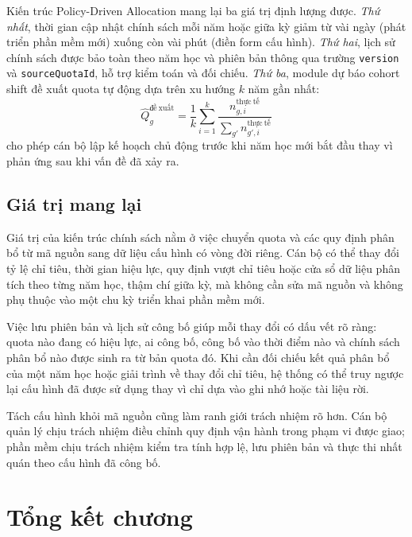 \documentclass[../DoAn.tex]{subfiles}
\begin{document}
Kiến trúc Policy-Driven Allocation mang lại ba giá trị định lượng được.
\textit{Thứ nhất}, thời gian cập nhật chính sách mỗi năm hoặc giữa kỳ giảm từ
vài ngày (phát triển phần mềm mới) xuống còn vài phút (điền form cấu hình).
\textit{Thứ hai}, lịch sử chính sách được bảo toàn theo năm học và phiên bản
thông qua trường \texttt{version} và \texttt{sourceQuotaId}, hỗ trợ kiểm toán
và đối chiếu.
\textit{Thứ ba}, module dự báo cohort shift đề xuất quota tự động dựa trên
xu hướng $k$ năm gần nhất:
\begin{equation}
\hat{Q}_g^{\mathrm{đề\ xuất}} = \frac{1}{k} \sum_{i=1}^{k}
    \frac{n_{g,i}^{\mathrm{thực\ tế}}}{\displaystyle\sum_{g'} n_{g',i}^{\mathrm{thực\ tế}}}
\label{eq:quota_recommendation}
\end{equation}
cho phép cán bộ lập kế hoạch chủ động trước khi năm học mới bắt đầu thay vì
phản ứng sau khi vấn đề đã xảy ra.

\subsection{Giá trị mang lại}
\label{subsec:policy_value}

Giá trị của kiến trúc chính sách nằm ở việc chuyển quota và các quy định phân
bổ từ mã nguồn sang dữ liệu cấu hình có vòng đời riêng. Cán bộ có thể thay đổi
tỷ lệ chỉ tiêu, thời gian hiệu lực, quy định vượt chỉ tiêu hoặc cửa sổ dữ liệu
phân tích theo từng năm học, thậm chí giữa kỳ, mà không cần sửa mã nguồn và
không phụ thuộc vào một chu kỳ triển khai phần mềm mới.

Việc lưu phiên bản và lịch sử công bố giúp mỗi thay đổi có dấu vết rõ ràng:
quota nào đang có hiệu lực, ai công bố, công bố vào thời điểm nào và chính
sách phân bổ nào được sinh ra từ bản quota đó. Khi cần đối chiếu kết quả phân
bổ của một năm học hoặc giải trình về thay đổi chỉ tiêu, hệ thống có thể truy
ngược lại cấu hình đã được sử dụng thay vì chỉ dựa vào ghi nhớ hoặc tài liệu
rời.

Tách cấu hình khỏi mã nguồn cũng làm ranh giới trách nhiệm rõ hơn. Cán bộ quản
lý chịu trách nhiệm điều chỉnh quy định vận hành trong phạm vi được giao; phần
mềm chịu trách nhiệm kiểm tra tính hợp lệ, lưu phiên bản và thực thi nhất quán
theo cấu hình đã công bố.

\section{Tổng kết chương}
\label{sec:contrib_summary}
\end{document}
